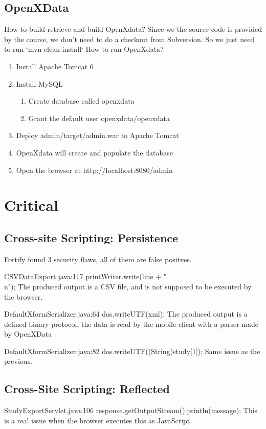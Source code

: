 \documentclass[11pt,a4paper]{article}
\theoremstyle{definition}
\begin{document}
\subsection{OpenXData}
How to build retrieve and build OpenXdata?
Since we the source code is provided by the course, we don’t need to do a checkout from Subversion. So we just need to run `mvn clean install`
How to run OpenXdata?
\begin{enumerate}
 \item Install Apache Tomcat 6 
 \item Install MySQL
 \begin{enumerate}
  \item Create database called openxdata
  \item Grant the default user openxdata/openxdata
 \end{enumerate}
 \item Deploy admin/target/admin.war to Apache Tomcat
 \item OpenXdata will create and populate the database
 \item Open the browser at http://localhost:8080/admin
\end{enumerate}

\section{Critical}

\subsection{Cross-site Scripting: Persistence}
Fortify found 3 security flaws, all of them are false positves.

CSVDataExport.java:117
printWriter.write(line + "\\n");
The produced output is a CSV file, and is not supposed to be executed by the browser.

DefaultXformSerializer.java:64
dos.writeUTF(xml);
The produced output is a defined binary protocol, the data is read by the mobile client with a parser made by OpenXData

DefaultXformSerializer.java:82
dos.writeUTF((String)study[1]);
Same issue as the previous.

\subsection{Cross-Site Scripting: Reflected}
StudyExportServlet.java:106
response.getOutputStream().println(message);
This is a real issue when the browser executes this as JavaScript.
\end{document}
